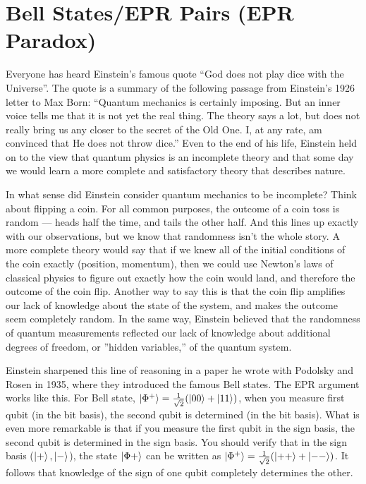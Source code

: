 \section{Bell States/EPR Pairs (EPR Paradox)}
Everyone has heard Einstein’s famous quote ``God does not play dice with the Universe”. The quote is a summary of the following passage from Einstein’s 1926 letter to Max Born: ``Quantum mechanics is certainly imposing. But an inner voice tells me that it is not yet the real thing. The theory says a lot, but does not really bring us any closer to the secret of the Old One. I, at any rate, am convinced that He does not throw dice.” Even to the end of his life, Einstein held on to the view that quantum physics is an incomplete theory and that some day we would learn a more complete and satisfactory theory that describes nature. 

In what sense did Einstein consider quantum mechanics to be incomplete? Think about flipping a coin. For all common purposes, the outcome of a coin toss is random — heads half the time, and tails the other half. And this lines up exactly with our observations, but we know that randomness isn’t the whole story. A more complete theory would say that if we knew all of the
initial conditions of the coin exactly (position, momentum), then we could use Newton’s laws of classical physics to figure out exactly how the coin would land, and therefore the outcome of the coin flip. Another way to say this is that the coin flip  amplifies our lack of knowledge about the state of the system, and makes the outcome seem completely random. In the same way, Einstein believed that the randomness of quantum measurements reflected our lack of knowledge about additional degrees of freedom, or ”hidden variables,” of the quantum system.

Einstein sharpened this line of reasoning in a paper he wrote with Podolsky and Rosen in 1935, where they introduced the famous Bell states. The EPR argument works like this. For Bell state, $\ket{\Phi^{+}}=\frac{1}{\sqrt{2}}(\ket{00}+\ket{11})$, when you measure first qubit (in the bit basis), the second qubit is determined (in the bit basis). What is even more remarkable is that if you measure the first qubit in the sign basis, the second qubit is determined in the sign basis. You should verify that in the sign basis ($\ket{+},\ket{-}$), the state $\ket{\Phi+}$ can be written as $\ket{\Phi^{+}}=\frac{1}{\sqrt{2}}(\ket{++}+\ket{--})$. It follows that knowledge of the sign of one qubit completely determines the other. 

